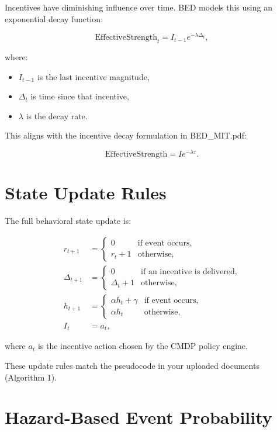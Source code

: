 Incentives have diminishing influence over time. BED models this using an
exponential decay function:


\[
\text{EffectiveStrength}_t = I_{t-1} e^{-\lambda \Delta_t},
\]


where:
\begin{itemize}
    \item $I_{t-1}$ is the last incentive magnitude,
    \item $\Delta_t$ is time since that incentive,
    \item $\lambda$ is the decay rate.
\end{itemize}

This aligns with the incentive decay formulation in BED\_MIT.pdf:


\[
\text{EffectiveStrength} = I e^{-\lambda \tau}.
\]



\section{State Update Rules}

The full behavioral state update is:



\[
\begin{aligned}
r_{t+1} &= 
\begin{cases}
0 & \text{if event occurs}, \\
r_t + 1 & \text{otherwise},
\end{cases} \\
\Delta_{t+1} &= 
\begin{cases}
0 & \text{if an incentive is delivered}, \\
\Delta_t + 1 & \text{otherwise},
\end{cases} \\
h_{t+1} &= 
\begin{cases}
\alpha h_t + \gamma & \text{if event occurs}, \\
\alpha h_t & \text{otherwise},
\end{cases} \\
I_t &= a_t,
\end{aligned}
\]


where $a_t$ is the incentive action chosen by the CMDP policy engine.

These update rules match the pseudocode in your uploaded documents (Algorithm 1).

\section{Hazard-Based Event Probability}

